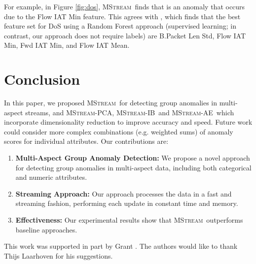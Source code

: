 \documentclass[sigconf]{acmart}
\newcommand{\method}{\textsc{MStream}}
\begin{document}
For example, in Figure \ref{fig:dos}, \method\ finds that  is an anomaly that occurs due to the Flow IAT Min feature. This agrees with \cite{sharafaldin2018toward}, which finds that the best feature set for DoS using a Random Forest approach (supervised learning; in contrast, our approach does not require labels) are B.Packet Len Std, Flow IAT Min, Fwd IAT Min, and Flow IAT Mean.

\iffalse
\subsection{Incorporating Correlation Between Features}
\label{sec:correlation}

Tables \ref{tab:auc} and \ref{tab:times} show the AUC and running time of \method, \method-PCA, \method-IB and \method-AE on the \emph{KDDCUP99}, \emph{CICIDS-DoS}, \emph{UNSW-NB 15} and \emph{CICIDS-DDoS} datasets. We observe that \method-AE outperforms \method, \method-PCA and \method-IB across all datasets while running faster than \method\ and having running time comparable to \method-PCA and \method-IB.
\fi \section{Conclusion}
In this paper, we proposed \method\ for detecting group anomalies in multi-aspect streams, and \method-PCA, \method-IB\ and \method-AE\ which incorporate dimensionality reduction to improve accuracy and speed. Future work could consider more complex combinations (e.g. weighted sums) of anomaly scores for individual attributes. Our contributions are:
\begin{enumerate}
    \item {\bf Multi-Aspect Group Anomaly Detection:} We propose a novel approach for detecting group anomalies in multi-aspect data, including both categorical and numeric attributes.
    \item {\bf Streaming Approach:} Our approach processes the data in a fast and streaming fashion, performing each update in constant time and memory.
    \item {\bf Effectiveness:} Our experimental results show that \method\ outperforms baseline approaches.
\end{enumerate}



%
 



\begin{acks}
This work was supported in part by  Grant . The authors would like to thank Thijs Laarhoven for his suggestions.
\end{acks}
\end{document}
